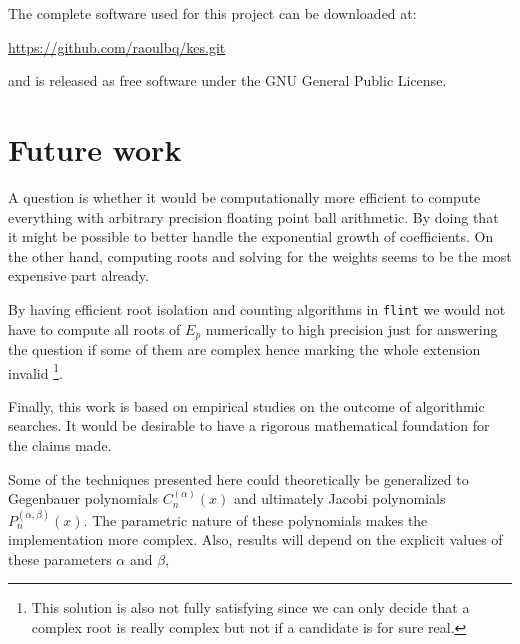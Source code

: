 \documentclass[a4paper,10pt]{article}
\begin{document}
The complete software used for this project can be downloaded at:

\begin{center}
  \url{https://github.com/raoulbq/kes.git}
\end{center}

and is released as free software under the GNU General Public License.


\FloatBarrier
\section{Future work}

A question is whether it would be computationally more efficient to compute
everything with arbitrary precision floating point ball arithmetic. By doing that
it might be possible to better handle the exponential growth of coefficients.
On the other hand, computing roots and solving for the weights seems to be
the most expensive part already.

By having efficient root isolation and counting algorithms in \texttt{flint} we would
not have to compute all roots of $E_p$ numerically to high precision just for answering
the question if some of them are complex hence marking the whole extension invalid
\footnote{This solution is also not fully satisfying since we can only
decide that a complex root is really complex but not if a candidate is for sure real.}.

Finally, this work is based on empirical studies on the outcome of algorithmic searches.
It would be desirable to have a rigorous mathematical foundation for the claims made.

Some of the techniques presented here could theoretically be generalized to Gegenbauer
polynomials $C_n^{(\alpha)}(x)$ and ultimately Jacobi polynomials $P_n^{(\alpha,\beta)}(x)$.
The parametric nature of these polynomials makes the implementation more complex. Also,
results will depend on the explicit values of these parameters $\alpha$ and $\beta$,


\end{document}
